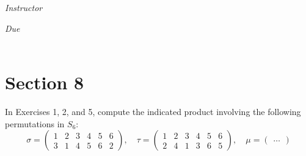 \documentclass[12pt, oneside]{book}
\begin{document}
\begin{titlepage}
\begin{center}
\begin{large}
            \vspace*{1\baselineskip}

            \textit{Instructor} \\[1ex] %
            \professor

            \vspace*{1\baselineskip}

            \textit{Due}\\[1ex]
            {\scshape  \finaldate} \\[0.3\baselineskip] %

            \thispagestyle{empty}

        \end{large}
    \end{center}
\end{titlepage}
\section*{Section 8}


In Exercises 1, 2, and 5, compute the indicated product involving the following permutations in \(S_{6}\):
\[
    \sigma = \begin{pmatrix}
        1 & 2 & 3 & 4 & 5 & 6 \\
        3 & 1 & 4 & 5 & 6 & 2
    \end{pmatrix}, \quad \tau = \begin{pmatrix}
        1 & 2 & 3 & 4 & 5 & 6 \\
        2 & 4 & 1 & 3 & 6 & 5
    \end{pmatrix}, \quad \mu = \begin{pmatrix}
        \ldots
    \end{pmatrix}
\]
\end{document}
